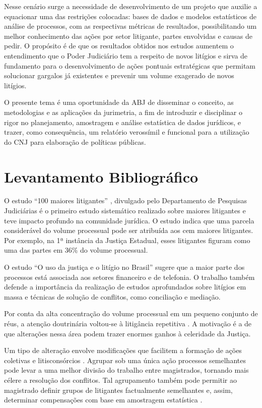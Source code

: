 \documentclass[]{report}
\begin{document}
Nesse cenário surge a necessidade de desenvolvimento de um projeto que
auxilie a equacionar uma das restrições colocadas: bases de dados e
modelos estatísticos de análise de processos, com as respectivas
métricas de resultados, possibilitando um melhor conhecimento das ações
por setor litigante, partes envolvidas e causas de pedir. O
propósito é de que os resultados obtidos nos estudos aumentem o
entendimento que o Poder Judiciário tem a respeito de novos litígios e
sirva de fundamento para o desenvolvimento de ações pontuais
estratégicas que permitam solucionar gargalos já existentes e prevenir
um volume exagerado de novos litígios.

O presente tema é uma oportunidade da ABJ de disseminar o conceito, as
metodologias e as aplicações da jurimetria, a fim de introduzir e
disciplinar o rigor no planejamento, amostragem e análise estatística de
dados jurídicos, e trazer, como consequência, um relatório verossímil e
funcional para a utilização do CNJ para elaboração de políticas
públicas.

\section{Levantamento Bibliográfico}\label{levantamento-bibliografico}

O estudo ``100 maiores litigantes'' \citep{CNJ2012}, divulgado pelo
Departamento de Pesquisas Judiciárias é o primeiro estudo sistemático
realizado sobre maiores litigantes e teve impacto profundo na comunidade
jurídica. O estudo indica que uma parcela considerável do volume
processual pode ser atribuída aos cem maiores litigantes. Por exemplo,
na 1ª instância da Justiça Estadual, esses litigantes figuram como uma
das partes em 36\% do volume processual.

O estudo ``O uso da justiça e o litígio no Brasil'' \citep{AMB2015}
sugere que a maior parte dos processos está associada aos setores
financeiro e de telefonia. O trabalho também defende a importância da
realização de estudos aprofundados sobre litígios em massa e técnicas de
solução de conflitos, como conciliação e mediação.

Por conta da alta concentração do volume processual em um pequeno
conjunto de réus, a atenção doutrinária voltou-se à litigância
repetitiva \citep{Silva2012}. A motivação é a de que alterações nessa
área podem trazer enormes ganhos à celeridade da Justiça.

Um tipo de alteração envolve modificações que facilitem a formação de
ações coletivas e litisconsórcios \citep[Marquezini2013,
Souza2014]{Mollica2010}. Agrupar sob uma única ação processos
semelhantes pode levar a uma melhor divisão do trabalho entre
magistrados, tornando mais célere a resolução dos conflitos. Tal
agrupamento também pode permitir ao magistrado definir grupos de
litigantes factualmente semelhantes e, assim, determinar compensações
com base em amostragem estatística \citep{Weinstein1997}.
\end{document}

